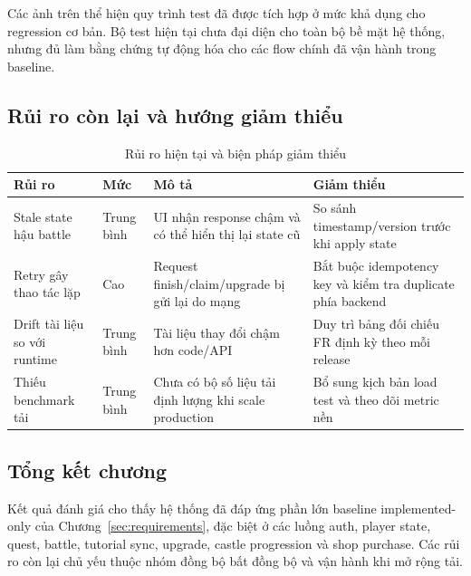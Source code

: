 Các ảnh trên thể hiện quy trình test đã được tích hợp ở mức khả dụng cho regression cơ bản. Bộ test hiện tại chưa đại diện cho toàn bộ bề mặt hệ thống, nhưng đủ làm bằng chứng tự động hóa cho các flow chính đã vận hành trong baseline.

\subsection{Rủi ro còn lại và hướng giảm thiểu}
\label{subsec:eval-risks}

\begin{table}[H]
\centering
\renewcommand{\arraystretch}{1.2}
\setlength{\tabcolsep}{6pt}
\begin{tabularx}{\textwidth}{|L{3.6cm}|L{2.0cm}|Y|L{3.8cm}|}
\hline
\textbf{Rủi ro} & \textbf{Mức} & \textbf{Mô tả} & \textbf{Giảm thiểu} \\
\hline
Stale state hậu battle & Trung bình & UI nhận response chậm và có thể hiển thị lại state cũ & So sánh timestamp/\allowbreak version trước khi apply state \\
\hline
Retry gây thao tác lặp & Cao & Request finish/\allowbreak claim/\allowbreak upgrade bị gửi lại do mạng & Bắt buộc idempotency key và kiểm tra duplicate phía backend \\
\hline
Drift tài liệu so với runtime & Trung bình & Tài liệu thay đổi chậm hơn code/API & Duy trì bảng đối chiếu FR định kỳ theo mỗi release \\
\hline
Thiếu benchmark tải & Trung bình & Chưa có bộ số liệu tải định lượng khi scale production & Bổ sung kịch bản load test và theo dõi metric nền \\
\hline
\end{tabularx}
\caption{Rủi ro hiện tại và biện pháp giảm thiểu}
\label{tab:risk-register}
\end{table}

\subsection{Tổng kết chương}
\label{subsec:eval-summary}

Kết quả đánh giá cho thấy hệ thống đã đáp ứng phần lớn baseline implemented-only của Chương~\ref{sec:requirements}, đặc biệt ở các luồng auth, player state, quest, battle, tutorial sync, upgrade, castle progression và shop purchase. Các rủi ro còn lại chủ yếu thuộc nhóm đồng bộ bất đồng bộ và vận hành khi mở rộng tải.
